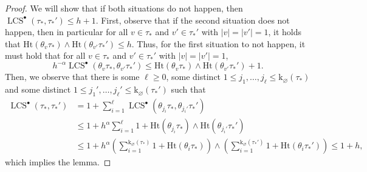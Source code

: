 \documentclass[11pt,reqno]{amsart}
\newcommand{\Ht}{\mathrm{Ht}}
\newcommand{\rk}{\mathrm{k}}
\newcommand{\LCS}{\operatorname{LCS}}
\begin{document}
\begin{proof}
  We will show that if both situations do not happen, then  $\LCS^\bullet(\tau_*,\tau_*')\le h+1$. First, observe that if the second situation does not happen, then in particular for all $v\in \tau_*$ and $v'\in \tau_*'$ with $|v|=|v'|=1$, it holds that $\Ht(\theta_v\tau_*)\wedge \Ht(\theta_{v'}\tau_*')\le h$. Thus, for the first situation to not happen, it must hold that for all $v\in \tau_*$ and $v'\in \tau_*'$ with $|v|=|v'|=1$, 
    \[h^{-\alpha}\LCS^\bullet(\theta_v\tau_*,\theta_{v'}\tau_*')\leq \Ht(\theta_v\tau_*)\wedge \Ht(\theta_{v'}\tau_*')+1.\]
    Then, we observe that there is some $\ell\ge 0$, some distinct $1\le j_1,\dots, j_\ell\le \rk_\varnothing(\tau_*)$ and some distinct $1\le j_1',\dots,j_\ell'\le \rk_\varnothing(\tau_*')$ such that 
    \begin{align*}\LCS^\bullet(\tau_*,\tau_*')&=1+\sum_{i=1}^\ell \LCS^\bullet(\theta_{j_i}\tau_*,\theta_{j_i'}\tau_*')\\
    &\le 1+h^\alpha \sum_{i=1}^\ell 1+ \Ht(\theta_{j_i}\tau_*)\wedge \Ht(\theta_{j_i'}\tau_*')\\
    &\le 1+h^\alpha \left(\sum_{i=1}^{\rk_\varnothing(\tau_*)}1+\Ht(\theta_i\tau_*)\right)\wedge \left(\sum_{i=1}^{\rk_\varnothing(\tau_*')}1+\Ht(\theta_i\tau_*')\right)\le 1+h,
    \end{align*}
    which implies the lemma.
\end{proof}
\end{document}

